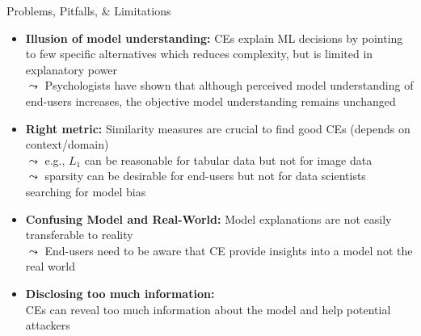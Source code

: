 \documentclass[11pt,compress,t,notes=noshow, aspectratio=169, xcolor=table]{beamer}
\begin{document}
\begin{frame}{Problems, Pitfalls, \& Limitations}
\begin{itemize}[<+->]
    \item \textbf{Illusion of model understanding:} 
    CEs explain ML decisions by pointing to few specific alternatives which reduces complexity, but is limited in explanatory power\\
    $\leadsto$ %
    Psychologists have shown that although perceived model understanding of end-users increases, the objective model understanding remains unchanged
    
    \item \textbf{Right metric:} Similarity measures are crucial to find good CEs (depends on context/domain)\\
    $\leadsto$ e.g., $L_1$ can be reasonable for tabular data but not for image data\\
    $\leadsto$ sparsity can be desirable for end-users but not for data scientists searching for model bias

    \item \textbf{Confusing Model and Real-World:} Model explanations are not easily transferable to reality\\
    $\leadsto$ End-users need to be aware that CE provide insights into a model not the real world %
    \item \textbf{Disclosing too much information:} \\
    CEs can reveal too much information about the model and help potential attackers
    \end{itemize}
\end{frame}
\end{document}
